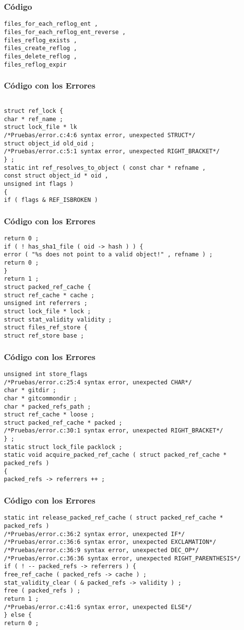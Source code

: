 \documentclass{beamer}
\begin{document}
\begin{frame}[fragile]
\frametitle{C\'odigo}
\begin{verbatim}
files_for_each_reflog_ent , 
files_for_each_reflog_ent_reverse , 
files_reflog_exists , 
files_create_reflog , 
files_delete_reflog , 
files_reflog_expir \end{verbatim}
\end{frame}
\begin{frame}[fragile]
\frametitle{C\'odigo con los Errores}
\begin{verbatim}

struct ref_lock { 
char * ref_name ; 
struct lock_file * lk 
/*Pruebas/error.c:4:6 syntax error, unexpected STRUCT*/
struct object_id old_oid ; 
/*Pruebas/error.c:5:1 syntax error, unexpected RIGHT_BRACKET*/
} ; 
static int ref_resolves_to_object ( const char * refname , 
const struct object_id * oid , 
unsigned int flags ) 
{ 
if ( flags & REF_ISBROKEN ) 
\end{verbatim}
\end{frame}
\begin{frame}[fragile]
\frametitle{C\'odigo con los Errores}
\begin{verbatim}
return 0 ; 
if ( ! has_sha1_file ( oid -> hash ) ) { 
error ( "%s does not point to a valid object!" , refname ) ; 
return 0 ; 
} 
return 1 ; 
struct packed_ref_cache { 
struct ref_cache * cache ; 
unsigned int referrers ; 
struct lock_file * lock ; 
struct stat_validity validity ; 
struct files_ref_store { 
struct ref_store base ; 
\end{verbatim}
\end{frame}
\begin{frame}[fragile]
\frametitle{C\'odigo con los Errores}
\begin{verbatim}
unsigned int store_flags 
/*Pruebas/error.c:25:4 syntax error, unexpected CHAR*/
char * gitdir ; 
char * gitcommondir ; 
char * packed_refs_path ; 
struct ref_cache * loose ; 
struct packed_ref_cache * packed ; 
/*Pruebas/error.c:30:1 syntax error, unexpected RIGHT_BRACKET*/
} ; 
static struct lock_file packlock ; 
static void acquire_packed_ref_cache ( struct packed_ref_cache * packed_refs ) 
{ 
packed_refs -> referrers ++ ; 
\end{verbatim}
\end{frame}
\begin{frame}[fragile]
\frametitle{C\'odigo con los Errores}
\begin{verbatim}
static int release_packed_ref_cache ( struct packed_ref_cache * packed_refs ) 
/*Pruebas/error.c:36:2 syntax error, unexpected IF*/
/*Pruebas/error.c:36:6 syntax error, unexpected EXCLAMATION*/
/*Pruebas/error.c:36:9 syntax error, unexpected DEC_OP*/
/*Pruebas/error.c:36:36 syntax error, unexpected RIGHT_PARENTHESIS*/
if ( ! -- packed_refs -> referrers ) { 
free_ref_cache ( packed_refs -> cache ) ; 
stat_validity_clear ( & packed_refs -> validity ) ; 
free ( packed_refs ) ; 
return 1 ; 
/*Pruebas/error.c:41:6 syntax error, unexpected ELSE*/
} else { 
return 0 ; 
\end{verbatim}
\end{frame}
\end{document}
